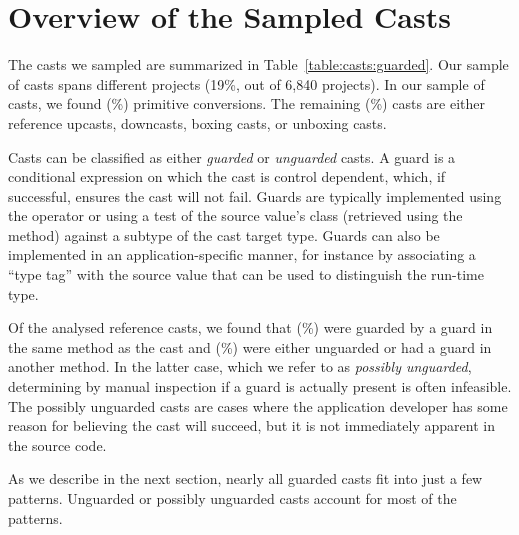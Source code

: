\section{Overview of the Sampled Casts}\label{sec:casts:overview}

The casts we sampled are summarized in Table~\ref{table:casts:guarded}.
Our sample of casts spans \nUniqueProjects{} different projects
(19\%, out of 6,840 projects).
In our sample of \nSize{} casts,
we found \nPrimitivePattern{} (\pPrimitivePattern\%) primitive conversions.
The remaining \nReference{} (\pReference\%) casts are either reference upcasts,
downcasts, boxing casts, or unboxing casts.



Casts can be classified as either \emph{guarded} or \emph{unguarded} casts.
A guard is a conditional expression on which the cast is control dependent,
which, if successful, ensures the cast will not fail.
Guards are typically implemented using the  operator or using
a test of the source value's class (retrieved using the
 method) against a subtype of the cast target type.
Guards can also be implemented in an application-specific manner, for instance
by associating a ``type tag'' with the source value that can be used to
distinguish the run-time type.

Of the \nReference{} analysed reference casts,
we found that \nGuarded{} (\pGuarded\%) were guarded by a
guard in the same method as the cast and \nUnguarded{} (\pUnguarded\%)
were either unguarded or had a guard in another method.
In the latter case, which we refer to as \emph{possibly unguarded},
determining by manual inspection if a guard is actually
present is often infeasible.
The possibly unguarded casts are cases where the application developer
has some reason for believing the cast will succeed,
but it is not immediately apparent in the source code.

As we describe in the next section,
nearly all guarded casts fit into just a few patterns.
Unguarded or possibly unguarded casts account for most of the patterns.
